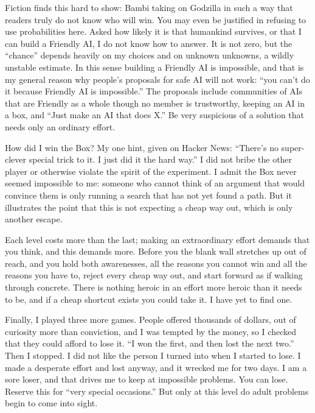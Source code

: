 Fiction finds this hard to show: Bambi taking on Godzilla in such a way that readers truly do not know who will win. You may even be justified in refusing to use probabilities here. Asked how likely it is that humankind survives, or that I can build a Friendly AI, I do not know how to answer. It is not zero, but the ``chance'' depends heavily on my choices and on unknown unknowns, a wildly unstable estimate. In this sense building a Friendly AI is impossible, and that is my general reason why people's proposals for safe AI will not work: ``you can't do it because Friendly AI is impossible.'' The proposals include communities of AIs that are Friendly as a whole though no member is trustworthy, keeping an AI in a box, and ``Just make an AI that does X.'' Be very suspicious of a solution that needs only an ordinary effort.

How did I win the Box? My one hint, given on Hacker News: ``There's no super-clever special trick to it. I just did it the hard way.'' I did not bribe the other player or otherwise violate the spirit of the experiment. I admit the Box never seemed impossible to me: someone who cannot think of an argument that would convince them is only running a search that has not yet found a path. But it illustrates the point that this is not expecting a cheap way out, which is only another escape.

Each level costs more than the last; making an extraordinary effort demands that you think, and this demands more. Before you the blank wall stretches up out of reach, and you hold both awarenesses, all the reasons you cannot win and all the reasons you have to, reject every cheap way out, and start forward as if walking through concrete. There is nothing heroic in an effort more heroic than it needs to be, and if a cheap shortcut exists you could take it. I have yet to find one. 

Finally, I played three more games. People offered thousands of dollars, out of curiosity more than conviction, and I was tempted by the money, so I checked that they could afford to lose it. ``I won the first, and then lost the next two.'' Then I stopped. I did not like the person I turned into when I started to lose. I made a desperate effort and lost anyway, and it wrecked me for two days. I am a sore loser, and that drives me to keep at impossible problems. You can lose. Reserve this for ``very special occasions.'' But only at this level do adult problems begin to come into sight.
